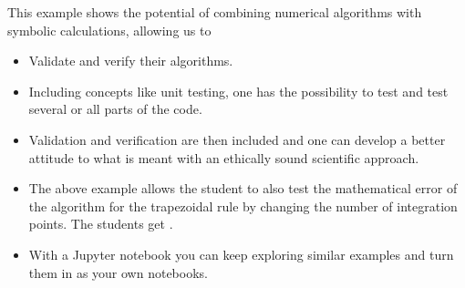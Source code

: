 \documentclass[letterpaper,10pt,english]{sphinxmanual}
\begin{document}
\begin{sphinxVerbatim}[commandchars=\\\{\}]
      
      
      
    \PYG{p}{[}\PYG{p}{]}   \PYG{p}{[}\PYG{p}{]}  
 
\end{sphinxVerbatim}

\noindent{}

This example shows the potential of combining numerical algorithms with symbolic calculations, allowing us to
\begin{itemize}
\item {} 
Validate and verify  their  algorithms.

\item {} 
Including concepts like unit testing, one has the possibility to test and test several or all parts of the code.

\item {} 
Validation and verification are then included  and one can develop a better attitude to what is meant with an ethically sound scientific approach.

\item {} 
The above example allows the student to also test the mathematical error of the algorithm for the trapezoidal rule by changing the number of integration points. The students get .

\item {} 
With a Jupyter notebook you can keep exploring similar examples and turn them in as your own notebooks.

\end{itemize}
\end{document}
